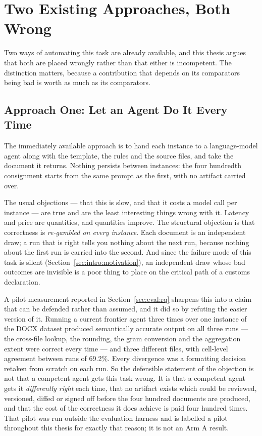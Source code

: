\section{Two Existing Approaches, Both Wrong}
\label{sec:intro:existing}

Two ways of automating this task are already available, and this thesis argues that both are
placed wrongly rather than that either is incompetent. The distinction matters, because a
contribution that depends on its comparators being bad is worth as much as its comparators.

\subsection{Approach One: Let an Agent Do It Every Time}
\label{sec:intro:existing:agent}

The immediately available approach is to hand each instance to a language-model agent along
with the template, the rules and the source files, and take the document it returns. Nothing
persists between instances: the four hundredth consignment starts from the same prompt as
the first, with no artifact carried over.

The usual objections --- that this is slow, and that it costs a model call per instance ---
are true and are the least interesting things wrong with it. Latency and price are
quantities, and quantities improve. The structural objection is that correctness is
\emph{re-gambled on every instance}. Each document is an independent draw; a run that is
right tells you nothing about the next run, because nothing about the first run is carried
into the second. And since the failure mode of this task is silent
(Section~\ref{sec:intro:motivation}), an independent draw whose bad outcomes are invisible is
a poor thing to place on the critical path of a customs declaration.

A pilot measurement reported in Section~\ref{sec:eval:rq} sharpens this into a claim that can
be defended rather than assumed, and it did so by refuting the easier version of it. Running
a current frontier agent three times over one instance of the DOCX dataset produced
semantically accurate output on all three runs --- the cross-file lookup, the rounding, the
gram conversion and the aggregation extent were correct every time --- and three different
files, with cell-level agreement between runs of 69.2\%. Every divergence was a formatting
decision retaken from scratch on each run. So the defensible statement of the objection is
not that a competent agent gets this task wrong. It is that a competent agent gets it
\emph{differently right} each time, that no artifact exists which could be reviewed,
versioned, diffed or signed off before the four hundred documents are produced, and that the
cost of the correctness it does achieve is paid four hundred times. That pilot was run
outside the evaluation harness and is labelled a pilot throughout this thesis for exactly
that reason; it is not an Arm A result.

